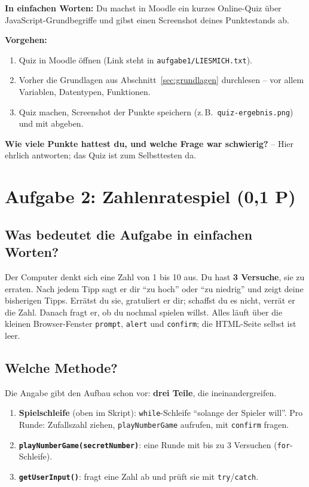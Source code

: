 \documentclass[a4paper,11pt]{article}
\begin{document}
\textbf{In einfachen Worten:} Du machst in Moodle ein kurzes Online-Quiz über JavaScript-Grundbegriffe und gibst
einen Screenshot deines Punktestands ab.

\textbf{Vorgehen:}
\begin{enumerate}[nosep]
\item Quiz in Moodle öffnen (Link steht in \texttt{aufgabe1/LIESMICH.txt}).
\item Vorher die Grundlagen aus Abschnitt~\ref{sec:grundlagen} durchlesen -- vor allem Variablen, Datentypen, Funktionen.
\item Quiz machen, Screenshot der Punkte speichern (z.\,B.\ \texttt{quiz-ergebnis.png}) und mit abgeben.
\end{enumerate}

\begin{tutor}
\textbf{Wie viele Punkte hattest du, und welche Frage war schwierig?} -- Hier ehrlich antworten; das Quiz ist zum
Selbsttesten da.
\end{tutor}

\section{Aufgabe 2: Zahlenratespiel (0,1 P)}\label{sec:a2}

\subsection{Was bedeutet die Aufgabe in einfachen Worten?}

Der Computer denkt sich eine Zahl von 1 bis 10 aus. Du hast \textbf{3 Versuche}, sie zu erraten. Nach jedem Tipp
sagt er dir "`zu hoch"' oder "`zu niedrig"' und zeigt deine bisherigen Tipps. Errätst du sie, gratuliert er dir;
schaffst du es nicht, verrät er die Zahl. Danach fragt er, ob du nochmal spielen willst. Alles läuft über die
kleinen Browser-Fenster \texttt{prompt}, \texttt{alert} und \texttt{confirm}; die HTML-Seite selbst ist leer.

\subsection{Welche Methode?}

Die Angabe gibt den Aufbau schon vor: \textbf{drei Teile}, die ineinandergreifen.
\begin{enumerate}[nosep]
\item \textbf{Spielschleife} (oben im Skript): \texttt{while}-Schleife "`solange der Spieler will"'. Pro Runde:
      Zufallszahl ziehen, \texttt{playNumberGame} aufrufen, mit \texttt{confirm} fragen.
\item \textbf{\texttt{playNumberGame(secretNumber)}}: eine Runde mit bis zu 3 Versuchen (\texttt{for}-Schleife).
\item \textbf{\texttt{getUserInput()}}: fragt eine Zahl ab und prüft sie mit \texttt{try}/\texttt{catch}.
\end{enumerate}
\end{document}
